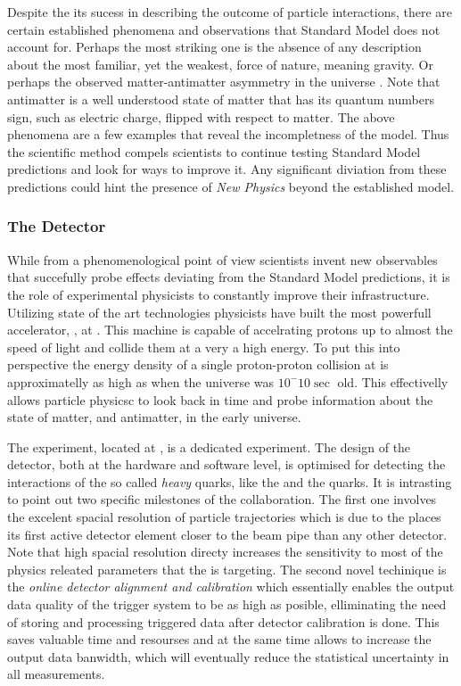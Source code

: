 Despite the its sucess in describing the outcome of particle interactions, there are certain
established phenomena and observations that Standard Model does not account for.
Perhaps the most striking one is the absence of any description about the most familiar,
yet the weakest, force of nature, meaning gravity. Or perhaps the observed matter-antimatter
asymmetry in the universe \cite{more-cpv-huet,more-cpv-gavela_I,more-cpv-gavela_II}.
Note that antimatter is a well understood state of matter that has its quantum numbers sign,
such as electric charge, flipped with respect to matter. The above phenomena are a few
examples that reveal the incompletness of the model. Thus the scientific method compels
scientists to continue testing Standard Model predictions and look for ways to improve it.
Any significant diviation from these predictions could hint the presence of
{\it New Physics} beyond the established model.


\subsubsection{The \lhcb Detector}
While from a phenomenological point of view scientists invent new observables that succefully probe
effects deviating from the Standard Model predictions, it is the role of experimental physicists to
constantly improve their infrastructure. Utilizing state of the art technologies physicists have
built the most powerfull accelerator, \lhc, at \cern. This machine is capable of accelrating protons
up to almost the speed of light and collide them at a very a high energy. To put this into perspective
the energy density of a single proton-proton collision at \lhc is approximatelly as high as when the
universe was $10^-10 \sec$ old. This effectivelly allows particle physicsc to look back in time and
probe information about the state of matter, and antimatter, in the early universe.

The \lhcb experiment, located at \cern, is a dedicated experiment. The design of the \lhcb detector,
both at the hardware and software level, is optimised for detecting the interactions of the so called
{\it heavy} quarks, like the \bquark and the \cquark quarks. It is intrasting to point out two specific
milestones of the \lhcb collaboration. The first one involves the excelent spacial resolution of particle
trajectories which is due to the \lhcb places its first active detector element closer to the \lhc beam
pipe than any other detector. Note that high spacial resolution directy increases the sensitivity to most
of the physics releated parameters that the \lhcb is targeting. The second novel techinique is the
{\it online detector alignment and calibration} which essentially enables the output data quality of the
trigger system to be as high as posible, elliminating the need of storing and processing triggered data
after detector calibration is done. This saves valuable time and resourses and at the same time allows
to increase the output data banwidth, which will eventually reduce the statistical uncertainty in all
\lhcb measurements.

